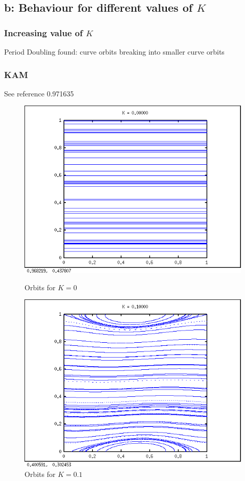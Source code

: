 \documentclass{article}
\begin{document}
\subsection*{b: Behaviour for different values of $K$}

\subsubsection*{Increasing value of $K$}
Period Doubling found: curve orbits breaking into smaller curve orbits

\subsubsection*{KAM}
See reference \cite{kval} 0.971635

\begin{figure}[h!]
\centering
\begin{minipage}{0.5\textwidth}
\centering
\includegraphics[width=\textwidth]{k0.png}
\caption{Orbits for $K = 0$}
\end{minipage}\hfill
\begin{minipage}{0.5\textwidth}
\centering
\includegraphics[width=\textwidth]{k01.png}
\caption{Orbits for $K = 0.1$}
\end{minipage}
\end{figure}
\end{document}
